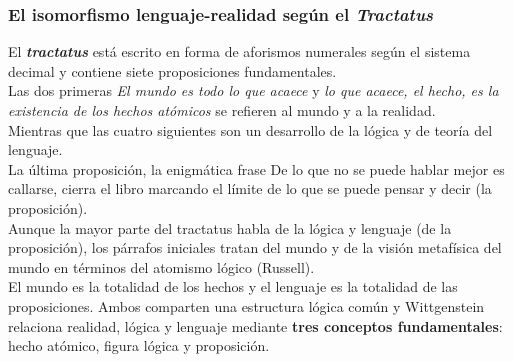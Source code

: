 \documentclass[a4paper, 11pt, twocolumn, spanish]{article}
\begin{document}
\subsubsection{El isomorfismo lenguaje-realidad según el \emph{Tractatus}}
\label{sec:org43e5624}
El \textbf{\emph{tractatus}} está escrito en forma de aforismos numerales según el
sistema decimal y contiene siete proposiciones fundamentales.\\
Las dos primeras \emph{El mundo es todo lo que acaece} y \emph{lo que acaece, el
hecho, es la existencia de los hechos atómicos} se refieren al mundo y
a la realidad.\\
Mientras que las cuatro siguientes son un desarrollo de la lógica y de
teoría del lenguaje.\\
La última proposición, la enigmática frase De lo que no se puede
hablar mejor es callarse, cierra el libro marcando el límite de lo que
se puede pensar y decir (la proposición).\\
Aunque la mayor parte del tractatus habla de la lógica y lenguaje (de
la proposición), los párrafos iniciales tratan del mundo y de la
visión metafísica del mundo en términos del atomismo lógico
(Russell).\\
El mundo es la totalidad de los hechos y el lenguaje es la totalidad
de las proposiciones. Ambos comparten una estructura lógica común y
Wittgenstein relaciona realidad, lógica y lenguaje mediante \textbf{tres
conceptos fundamentales}: hecho atómico, figura lógica y
proposición.\\
\end{document}

